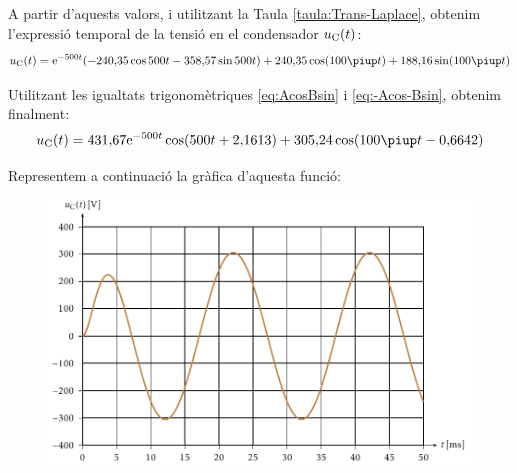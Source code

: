 \begin{exemple}
A partir d'aquests valors, i utilitzant la Taula
\vref{taula:Trans-Laplace}, obtenim l'expressi\'{o} temporal de la
tensi\'{o} en el condensador $u_\mathrm{C}(t)$:
\[
    u\ped{C}(t) = \eu^{-500t} (-240{,}35 \cos 500 t - 358{,}57 \sin 500
    t) + 240{,}35 \cos (100\piup t) + 188{,}16 \sin( 100\piup
    t)
\]

Utilitzant les igualtats trigonom\`{e}triques \eqref{eq:AcosBsin} i
\eqref{eq:-Acos-Bsin}, obtenim finalment:
\[
    u\ped{C}(t)= 431{,}67 \eu^{-500t} \cos(500 t +2{,}1613) + 305{,}24 \cos (100\piup t - 0{,}6642)
\]


 Representem a continuaci\'{o} la gr\`{a}fica d'aquesta
funci\'{o}:

\begin{figure}[h]
\centering
  \includegraphics{Imatges/Cap-Laplace-Exemple4-Tensio.pdf}
\end{figure}

\end{exemple}
